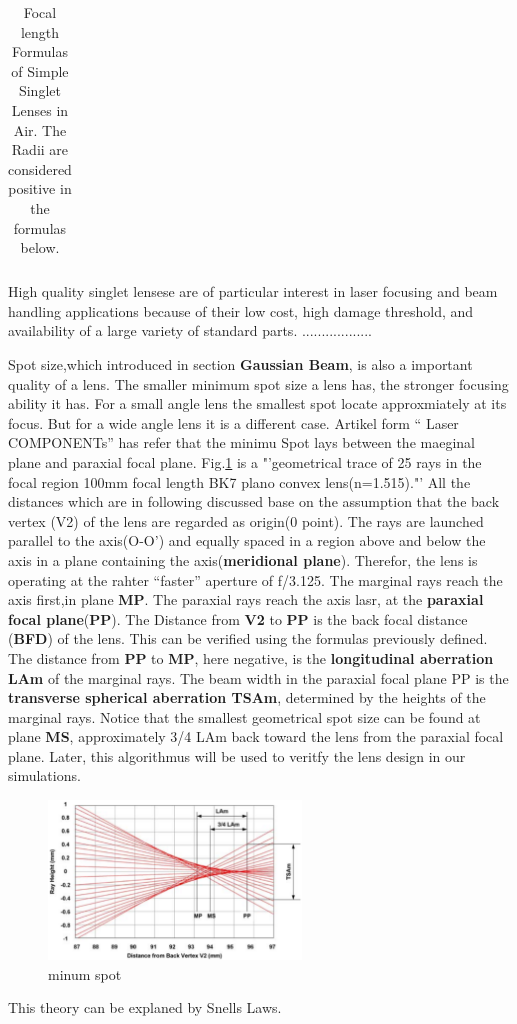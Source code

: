 \begin{table}
\begin{tabular}{|c|c|c|}
\hline
\end{tabular}
\caption{Focal length Formulas of Simple Singlet Lenses in Air.  
				 The Radii are considered positive in the formulas below.}
\label{tab:lenses_focal_length}
\end{table}


High quality singlet lensese are of particular interest in laser focusing and beam handling applications because of their low cost, high damage threshold, and availability of a large variety of standard parts. ..................

Spot size,which introduced in section \textbf{Gaussian Beam}, is also a important quality of a lens. The smaller minimum spot size a lens has, the stronger focusing ability it has.  For a small angle lens the smallest spot locate approxmiately at its focus. But for a wide angle lens it is a different case.
Artikel form "` Laser COMPONENTs"' has refer that the minimu Spot lays between the maeginal plane and paraxial focal plane. Fig.\ref{fig:min_max_spot} is a "'geometrical trace of 25 rays in the focal region 100mm focal length BK7 plano convex lens(n=1.515)."' All the distances which are in following discussed base on the assumption that the back vertex (V2) of the lens are regarded as origin(0 point). The rays are launched parallel to the axis(O-O') and equally spaced in a region above and below the axis in a plane containing the axis(\textbf{meridional plane}). Therefor, the lens is operating at the rahter "`faster"' aperture of f/3.125. The marginal rays reach the axis first,in plane \textbf{MP}. The paraxial rays reach the axis lasr, at the \textbf{paraxial focal plane}(\textbf{PP}). The Distance from \textbf{V2} to \textbf{PP} is the back focal distance (\textbf{BFD}) of the lens. This can be verified using the formulas previously defined. The distance from \textbf{PP} to \textbf{MP}, here negative, is the \textbf{longitudinal aberration LAm} of the marginal rays. The beam width in the paraxial focal plane PP is the \textbf{transverse spherical aberration TSAm}, determined by the heights of the marginal rays. Notice that the smallest geometrical spot size can be found at plane \textbf{MS}, approximately 3/4 LAm back toward the lens from the paraxial focal plane. Later, this algorithmus will be used to veritfy the lens design in our simulations. 

  

\begin{figure}[httbp]
\centering
\includegraphics[width=0.6\textwidth]{bilder/min_max_spot}
\caption{minum spot}
\label{fig:min_max_spot}
\end{figure}
This theory can be explaned by Snells Laws. 
	
	
	
	
	
	
	
	
	
	
	